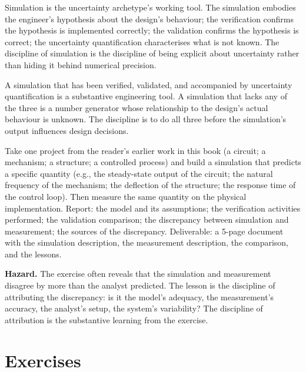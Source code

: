 \begin{archetype}[uncertainty]
Simulation is the uncertainty archetype's working tool. The simulation embodies the engineer's hypothesis about the design's behaviour; the verification confirms the hypothesis is implemented correctly; the validation confirms the hypothesis is correct; the uncertainty quantification characterises what is not known. The discipline of simulation is the discipline of being explicit about uncertainty rather than hiding it behind numerical precision.
\end{archetype}

\begin{principle}
A simulation that has been verified, validated, and accompanied by uncertainty quantification is a substantive engineering tool. A simulation that lacks any of the three is a number generator whose relationship to the design's actual behaviour is unknown. The discipline is to do all three before the simulation's output influences design decisions.
\end{principle}

\begin{project}
Take one project from the reader's earlier work in this book (a circuit; a mechanism; a structure; a controlled process) and build a simulation that predicts a specific quantity (e.g., the steady-state output of the circuit; the natural frequency of the mechanism; the deflection of the structure; the response time of the control loop). Then measure the same quantity on the physical implementation. Report: the model and its assumptions; the verification activities performed; the validation comparison; the discrepancy between simulation and measurement; the sources of the discrepancy. Deliverable: a 5-page document with the simulation description, the measurement description, the comparison, and the lessons.

\textbf{Hazard.} The exercise often reveals that the simulation and measurement disagree by more than the analyst predicted. The lesson is the discipline of attributing the discrepancy: is it the model's adequacy, the measurement's accuracy, the analyst's setup, the system's variability? The discipline of attribution is the substantive learning from the exercise.
\end{project}

\section{Exercises}

